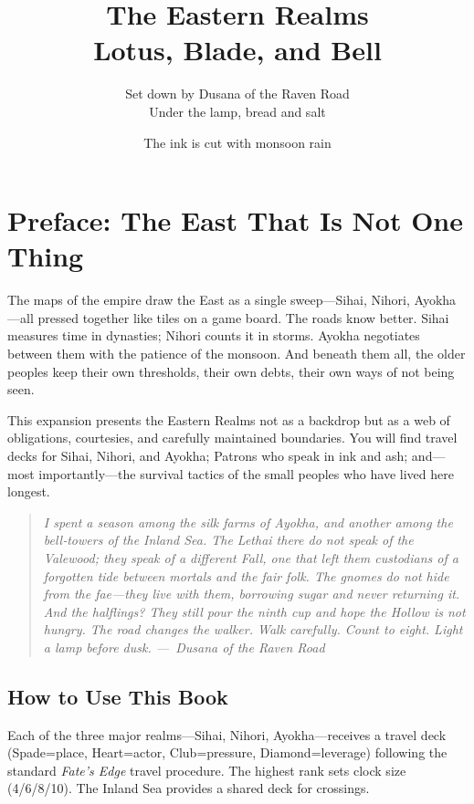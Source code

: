 \documentclass[12pt]{book}
\newcommand{\dusana}[1]{%
    \begin{quote}\itshape #1 ---~Dusana of the Raven Road\end{quote}}
\begin{document}
\title{
    \Huge\textbf{The Eastern Realms}\\[0.5em]
    \Large Lotus, Blade, and Bell
}
\author{
    Set down by Dusana of the Raven Road\\
    \small Under the lamp, bread and salt
}
\date{
    \small The ink is cut with monsoon rain
}
\maketitle

\tableofcontents

\chapter{Preface: The East That Is Not One Thing}

The maps of the empire draw the East as a single sweep---Sihai, Nihori, Ayokha---all pressed together like tiles on a game board. The roads know better. Sihai measures time in dynasties; Nihori counts it in storms. Ayokha negotiates between them with the patience of the monsoon. And beneath them all, the older peoples keep their own thresholds, their own debts, their own ways of not being seen.

This expansion presents the Eastern Realms not as a backdrop but as a web of obligations, courtesies, and carefully maintained boundaries. You will find travel decks for Sihai, Nihori, and Ayokha; Patrons who speak in ink and ash; and---most importantly---the survival tactics of the small peoples who have lived here longest.

\vspace{1em}
\dusana{I spent a season among the silk farms of Ayokha, and another among the bell‑towers of the Inland Sea. The Lethai there do not speak of the Valewood; they speak of a different Fall, one that left them custodians of a forgotten tide between mortals and the fair folk. The gnomes do not hide from the fae---they live with them, borrowing sugar and never returning it. And the halflings? They still pour the ninth cup and hope the Hollow is not hungry. The road changes the walker. Walk carefully. Count to eight. Light a lamp before dusk.}

\section{How to Use This Book}

Each of the three major realms---Sihai, Nihori, Ayokha---receives a travel deck (Spade=place, Heart=actor, Club=pressure, Diamond=leverage) following the standard \textit{Fate's Edge} travel procedure. The highest rank sets clock size (4/6/8/10). The Inland Sea provides a shared deck for crossings.
\end{document}
